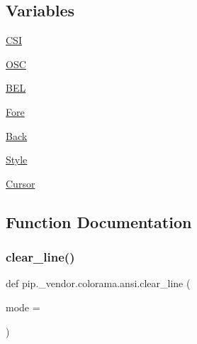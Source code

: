 \subsection*{Variables}
\begin{DoxyCompactItemize}
\item 
\hyperlink{namespacepip_1_1__vendor_1_1colorama_1_1ansi_a41f3b80546d97efa42153f702d596abf}{C\+SI}
\item 
\hyperlink{namespacepip_1_1__vendor_1_1colorama_1_1ansi_aea2222a3539bf0bd3d09a582837e688f}{O\+SC}
\item 
\hyperlink{namespacepip_1_1__vendor_1_1colorama_1_1ansi_a254704f78786145d3a182982cfdbbf05}{B\+EL}
\item 
\hyperlink{namespacepip_1_1__vendor_1_1colorama_1_1ansi_a60a3eaf79f87ef20f2c753f82e2b81ac}{Fore}
\item 
\hyperlink{namespacepip_1_1__vendor_1_1colorama_1_1ansi_a833dc641941081fe4f0e434b87718277}{Back}
\item 
\hyperlink{namespacepip_1_1__vendor_1_1colorama_1_1ansi_ab14785ef009c8d244da6f51b9a9e3755}{Style}
\item 
\hyperlink{namespacepip_1_1__vendor_1_1colorama_1_1ansi_ad6786dcef767f3fc8b9820ac7048d0aa}{Cursor}
\end{DoxyCompactItemize}


\subsection{Function Documentation}
\mbox{\label{namespacepip_1_1__vendor_1_1colorama_1_1ansi_a90721da1b73ffa98fe65772be0434f8e}} 
\subsubsection{\texorpdfstring{clear\+\_\+line()}{clear\_line()}}
{\footnotesize\ttfamily def pip.\+\_\+vendor.\+colorama.\+ansi.\+clear\+\_\+line (\begin{DoxyParamCaption}\item[{}]{mode = {} }\end{DoxyParamCaption})}

\mbox{\label{namespacepip_1_1__vendor_1_1colorama_1_1ansi_a790e79db119d1c04afb53ce76e52ec52}} 
